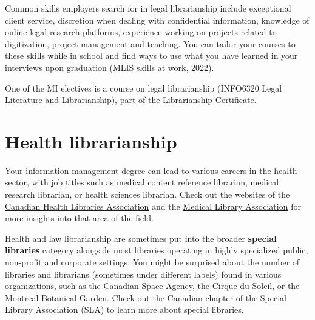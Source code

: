 \documentclass[
  letterpaper,
  DIV=11,
  numbers=noendperiod]{scrreprt}
\begin{document}
Common skills employers search for in legal librarianship include
exceptional client service, discretion when dealing with confidential
information, knowledge of online legal research platforms, experience
working on projects related to digitization, project management and
teaching. You can tailor your courses to these skills while in school
and find ways to use what you have learned in your interviews upon
graduation (MLIS skills at work, 2022).

\begin{tcolorbox}[enhanced jigsaw, arc=.35mm, bottomrule=.15mm, bottomtitle=1mm, breakable, colback=white, colbacktitle=quarto-callout-note-color!10!white, colframe=quarto-callout-note-color-frame, coltitle=black, left=2mm, leftrule=.75mm, opacityback=0, opacitybacktitle=0.6, rightrule=.15mm, title=\textcolor{quarto-callout-note-color}{\faInfo}\hspace{0.5em}{Did you know?}, titlerule=0mm, toprule=.15mm, toptitle=1mm]

One of the MI electives is a course on legal librarianship (INFO6320
Legal Literature and Librarianship), part of the Librarianship
\href{https://www.dal.ca/faculty/management/school-of-information-management/current-students-site/certificates.html\#librarianship}{Certificate}.

\end{tcolorbox}

\section{Health librarianship}\label{health-librarianship}

Your information management degree can lead to various careers in the
health sector, with job titles such as medical content reference
librarian, medical research librarian, or health sciences librarian.
Check out the websites of the \href{https://www.chla-absc.ca/}{Canadian
Health Libraries Association} and the
\href{https://www.mlanet.org/}{Medical Library Association} for more
insights into that area of the field.

Health and law librarianship are sometimes put into the broader
\textbf{special libraries} category alongside most libraries operating
in highly specialized public, non-profit and corporate settings. You
might be surprised about the number of libraries and librarians
(sometimes under different labels) found in various organizations, such
as the \href{https://www.asc-csa.gc.ca/eng/library/}{Canadian Space
Agency}, the Cirque du Soleil, or the Montreal Botanical Garden. Check
out the Canadian chapter of the Special Library Association (SLA) to
learn more about special libraries.
\end{document}
